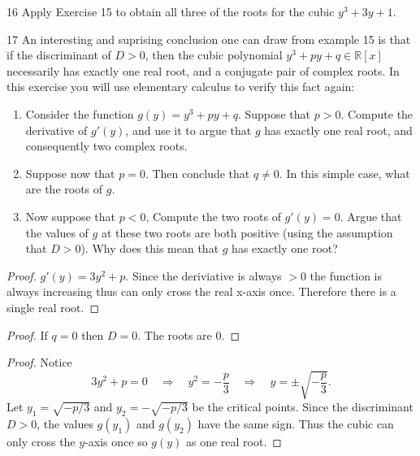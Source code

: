 \begin{problem}{16}
    Apply Exercise 15 to obtain all three of the roots for the cubic $y^3 + 3y + 1$.
\end{problem}
\unsolved

\begin{problem}{17}
    An interesting and suprising conclusion one can draw from example 15 is that 
    if the discriminant of $D > 0$, then the cubic polynomial $y^3 + py + q \in \mathbb{R}[x]$
        necessarily has exactly one real root, and a conjugate pair of complex roots. 
    In this exercise you will use elementary calculus to verify this fact again:
    \begin{enumerate}
        \item Consider the function $g(y) = y^3 + py + q$. Suppose that $p > 0$.
              Compute the derivative of $g'(y)$, and use it to argue that $g$ 
              has exactly one real root, and consequently two complex roots.
        \item Suppose now that $p = 0$. Then conclude that $q \ne 0$. In this simple case,
              what are the roots of $g$.
        \item Now suppose that $p < 0$, Compute the two roots of $g'(y) = 0$.
              Argue that the values of $g$ at these two roots are both positive (using the assumption that $D > 0$).
              Why does this mean that $g$ has exactly one root?
    \end{enumerate}
\end{problem}
\solved

\begin{proof}
    $g'(y) = 3y^2 + p$. Since the deriviative is always $> 0$ the function is always increasing 
        thus can only cross the real x-axis once. Therefore there is a single real root.
\end{proof}

\begin{proof}
    If $q = 0$ then $D = 0$. The roots are $0$.
\end{proof}

\begin{proof}
    Notice
    \[
    3y^2 + p = 0 \quad \Rightarrow \quad y^2 = -\frac{p}{3} \quad \Rightarrow \quad y = \pm \sqrt{-\frac{p}{3}}.
    \]
    Let $y_1 = \sqrt{-p/3}$ and $y_2 = -\sqrt{-p/3}$ be the critical points.  
    Since the discriminant $D > 0$, the values $g(y_1)$ and $g(y_2)$ have the same sign.
    Thus the cubic can only cross the $y$-axis once so $g(y)$ as one real root.
\end{proof}

